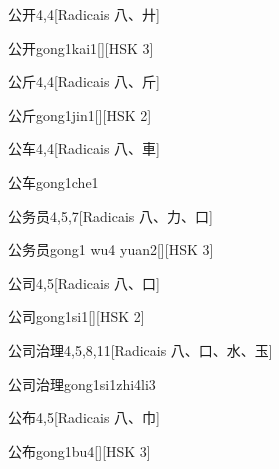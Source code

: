 \begin{entry}{公开}{4,4}[Radicais ⼋、⼶]
  \begin{phonetics}{公开}{gong1kai1}[][HSK 3]
  \end{phonetics}
\end{entry}

\begin{entry}{公斤}{4,4}[Radicais ⼋、⽄]
  \begin{phonetics}{公斤}{gong1jin1}[][HSK 2]
  \end{phonetics}
\end{entry}

\begin{entry}{公车}{4,4}[Radicais ⼋、⾞]
  \begin{phonetics}{公车}{gong1che1}
  \end{phonetics}
\end{entry}

\begin{entry}{公务员}{4,5,7}[Radicais ⼋、⼒、⼝]
  \begin{phonetics}{公务员}{gong1 wu4 yuan2}[][HSK 3]
  \end{phonetics}
\end{entry}

\begin{entry}{公司}{4,5}[Radicais ⼋、⼝]
  \begin{phonetics}{公司}{gong1si1}[][HSK 2]
  \end{phonetics}
\end{entry}

\begin{entry}{公司治理}{4,5,8,11}[Radicais ⼋、⼝、⽔、⽟]
  \begin{phonetics}{公司治理}{gong1si1zhi4li3}
  \end{phonetics}
\end{entry}

\begin{entry}{公布}{4,5}[Radicais ⼋、⼱]
  \begin{phonetics}{公布}{gong1bu4}[][HSK 3]
  \end{phonetics}
\end{entry}

